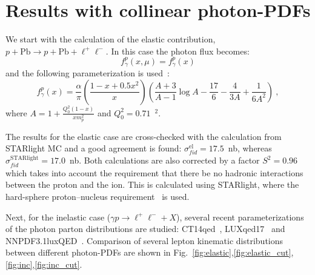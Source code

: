 \section{Results with collinear photon-PDFs}

We start with the calculation of the elastic contribution, $p+\textrm{Pb}\rightarrow p+\textrm{Pb}+ \ell^+\ell^-$.
In this case the photon flux becomes:
\begin{equation}
f_\gamma^{p}(x,\mu) = f_\gamma^{p}(x) 
\end{equation}
and the following parameterization is used~\cite{}:
\begin{equation}
f_\gamma^{p}(x) = \frac{\alpha}{\pi}
\left(
\frac{1-x+0.5x^2}{x}
\right)
\left(
\frac{A+3}{A-1}\log{A}-\frac{17}{6}-\frac{4}{3A}+\frac{1}{6A^2}
\right)~,
\end{equation}
where $A = 1+\frac{Q_0^2(1-x)}{x m_p^2}$ and $Q_0^2 = 0.71$~\GeV$^2$.

The results for the elastic case are cross-checked with the calculation from STARlight MC and a good agreement is found:
$\sigma_{fid}^{\textrm{el}} = 17.5$~nb, whereas $\sigma_{fid}^{\textrm{STARlight}} = 17.0$~nb.
Both calculations are also corrected by a factor $S^2=0.96$ which takes into account the requirement that there be no hadronic interactions between the proton and the ion. This is calculated using STARlight, where the hard-sphere proton--nucleus requirement~\cite{Klein:2016yzr} is used.

Next, for the inelastic case ($\gamma p\rightarrow \ell^+\ell^- + X$), several recent parameterizations of the photon parton distributions are studied: CT14qed~\cite{Schmidt:2015zda}, LUXqed17~\cite{Manohar:2017eqh} and NNPDF3.1luxQED~\cite{Bertone:2017bme}.
Comparison of several lepton kinematic distributions between different photon-PDFs are shown in Fig.~\ref{fig:elastic},\ref{fig:elastic_cut},\ref{fig:inc},\ref{fig:inc_cut}.

